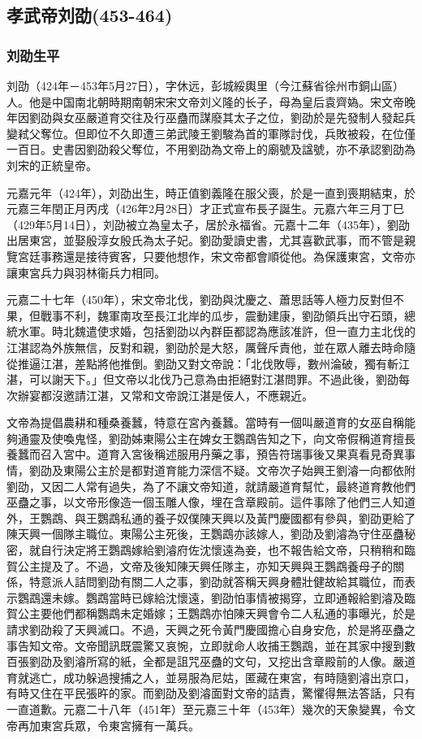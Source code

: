 
\subsection{孝武帝刘劭\tiny(453-464)}

\subsubsection{刘劭生平}

刘劭（424年－453年5月27日），字休远，彭城綏輿里（今江蘇省徐州市銅山區）人。他是中国南北朝時期南朝宋宋文帝刘义隆的长子，母為皇后袁齊媯。宋文帝晚年因劉劭與女巫嚴道育交往及行巫蠱而謀廢其太子之位，劉劭於是先發制人發起兵變弒父奪位。但即位不久即遭三弟武陵王劉駿為首的軍隊討伐，兵敗被殺，在位僅一百日。史書因劉劭殺父奪位，不用劉劭為文帝上的廟號及諡號，亦不承認劉劭為刘宋的正統皇帝。

元嘉元年（424年），刘劭出生，時正值劉義隆在服父喪，於是一直到喪期結束，於元嘉三年閏正月丙戌（426年2月28日）才正式宣布長子誕生。元嘉六年三月丁巳（429年5月14日），刘劭被立為皇太子，居於永福省。元嘉十二年（435年），劉劭出居東宮，並娶殷淳女殷氏為太子妃。劉劭愛讀史書，尤其喜歡武事，而不管是親覽宮廷事務還是接待賓客，只要他想作，宋文帝都會順從他。為保護東宮，文帝亦讓東宮兵力與羽林衞兵力相同。

元嘉二十七年（450年），宋文帝北伐，劉劭與沈慶之、蕭思話等人極力反對但不果，但戰事不利，魏軍南攻至長江北岸的瓜步，震動建康，劉劭領兵出守石頭，總統水軍。時北魏遣使求婚，包括劉劭以內群臣都認為應該准許，但一直力主北伐的江湛認為外族無信，反對和親，劉劭於是大怒，厲聲斥責他，並在眾人離去時命隨從推逼江湛，差點將他推倒。劉劭又對文帝說：「北伐敗辱，數州淪破，獨有斬江湛，可以謝天下。」但文帝以北伐乃己意為由拒絕對江湛問罪。不過此後，劉劭每次辦宴都沒邀請江湛，又常和文帝說江湛是佞人，不應親近。

文帝為提倡農耕和種桑養蠶，特意在宮內養蠶。當時有一個叫嚴道育的女巫自稱能夠通靈及使喚鬼怪，劉劭姊東陽公主在婢女王鸚鵡告知之下，向文帝假稱道育擅長養蠶而召入宮中。道育入宮後稱述服用丹藥之事，預告符瑞事後又果真看見奇異事情，劉劭及東陽公主於是都對道育能力深信不疑。文帝次子始興王劉濬一向都依附劉劭，又因二人常有過失，為了不讓文帝知道，就請嚴道育幫忙，最終道育教他們巫蠱之事，以文帝形像造一個玉雕人像，埋在含章殿前。這件事除了他們三人知道外，王鸚鵡、與王鸚鵡私通的養子奴僕陳天興以及黃門慶國都有參與，劉劭更給了陳天興一個隊主職位。東陽公主死後，王鸚鵡亦該嫁人，劉劭及劉濬為守住巫蠱秘密，就自行決定將王鸚鵡嫁給劉濬府佐沈懷遠為妾，也不報告給文帝，只稍稍和臨賀公主提及了。不過，文帝及後知陳天興任隊主，亦知天興與王鸚鵡養母子的關係，特意派人詰問劉劭有關二人之事，劉劭就答稱天興身體壯健故給其職位，而表示鸚鵡還未嫁。鸚鵡當時已嫁給沈懷遠，劉劭怕事情被揭穿，立即通報給劉濬及臨賀公主要他們都稱鸚鵡未定婚嫁；王鸚鵡亦怕陳天興會令二人私通的事曝光，於是請求劉劭殺了天興滅口。不過，天興之死令黃門慶國擔心自身安危，於是將巫蠱之事告知文帝。文帝聞訊既震驚又哀惋，立即就命人收捕王鸚鵡，並在其家中搜到數百張劉劭及劉濬所寫的紙，全都是詛咒巫蠱的文句，又挖出含章殿前的人像。嚴道育就逃亡，成功躲過搜捕之人，並易服為尼姑，匿藏在東宮，有時隨劉濬出京口，有時又住在平民張旿的家。而劉劭及劉濬面對文帝的詰責，驚懼得無法答話，只有一直道歉。元嘉二十八年（451年）至元嘉三十年（453年）幾次的天象變異，令文帝再加東宮兵眾，令東宮擁有一萬兵。

